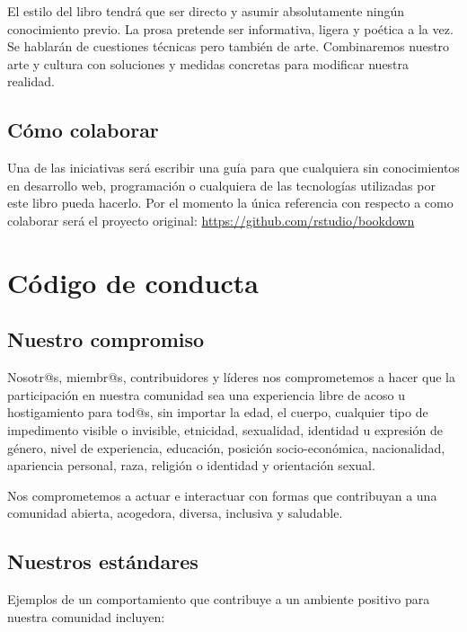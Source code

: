 \documentclass[
]{book}
\begin{document}
El estilo del libro tendrá que ser directo y asumir absolutamente ningún conocimiento previo. La prosa pretende ser informativa, ligera y poética a la vez. Se hablarán de cuestiones técnicas pero también de arte. Combinaremos nuestro arte y cultura con soluciones y medidas concretas para modificar nuestra realidad.

\hypertarget{cuxf3mo-colaborar}{%
\section{Cómo colaborar}\label{cuxf3mo-colaborar}}

Una de las iniciativas será escribir una guía para que cualquiera sin conocimientos en desarrollo web, programación o cualquiera de las tecnologías utilizadas por este libro pueda hacerlo. Por el momento la única referencia con respecto a como colaborar será el proyecto original: \url{https://github.com/rstudio/bookdown}

\hypertarget{codigo-de-conducta}{%
\chapter{Código de conducta}\label{codigo-de-conducta}}

\hypertarget{nuestro-compromiso}{%
\section{Nuestro compromiso}\label{nuestro-compromiso}}

Nosotr@s, miembr@s, contribuidores y líderes nos comprometemos a hacer que la participación en nuestra comunidad sea una experiencia libre de acoso u hostigamiento para tod@s, sin importar la edad, el cuerpo, cualquier tipo de impedimento visible o invisible, etnicidad, sexualidad, identidad u expresión de género, nivel de experiencia, educación, posición socio-económica, nacionalidad, apariencia personal, raza, religión o identidad y orientación sexual.

Nos comprometemos a actuar e interactuar con formas que contribuyan a una comunidad abierta, acogedora, diversa, inclusiva y saludable.

\hypertarget{nuestros-estuxe1ndares}{%
\section{Nuestros estándares}\label{nuestros-estuxe1ndares}}

Ejemplos de un comportamiento que contribuye a un ambiente positivo para nuestra comunidad incluyen:
\end{document}
